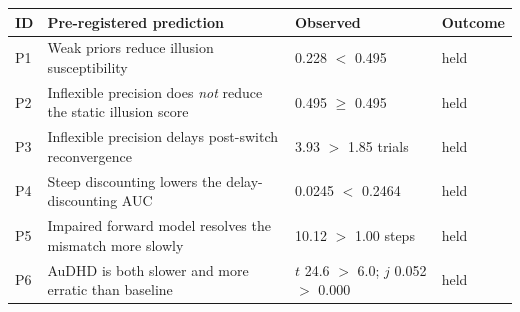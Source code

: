 \begin{tabular}{llll}
\toprule
ID & Pre-registered prediction & Observed & Outcome \\
\midrule
P1 & Weak priors reduce illusion susceptibility & 0.228 $<$ 0.495 & held \\
P2 & Inflexible precision does \emph{not} reduce the static illusion score & 0.495 $\geq$ 0.495 & held \\
P3 & Inflexible precision delays post-switch reconvergence & 3.93 $>$ 1.85 trials & held \\
P4 & Steep discounting lowers the delay-discounting AUC & 0.0245 $<$ 0.2464 & held \\
P5 & Impaired forward model resolves the mismatch more slowly & 10.12 $>$ 1.00 steps & held \\
P6 & AuDHD is both slower and more erratic than baseline & $t$ 24.6 $>$ 6.0; $j$ 0.052 $>$ 0.000 & held \\
\bottomrule
\end{tabular}
